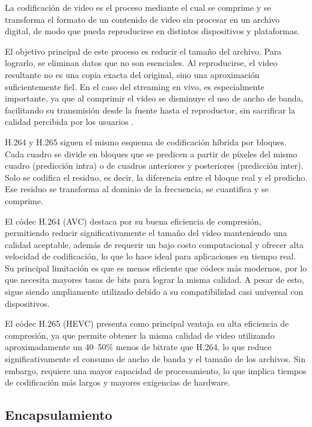 \documentclass[12pt,a4paper]{article}
\begin{document}
La codificación de video es el proceso mediante el cual se comprime y se transforma el formato de un contenido de video sin procesar en un archivo digital, de modo que pueda reproducirse en distintos dispositivos y plataformas.

El objetivo principal de este proceso es reducir el tamaño del archivo. Para lograrlo, se eliminan datos que no son esenciales. Al reproducirse, el video resultante no es una copia exacta del original, sino una aproximación suficientemente fiel. En el caso del streaming en vivo, es especialmente importante, ya que al comprimir el video se disminuye el uso de ancho de banda, facilitando su transmisión desde la fuente hasta el reproductor, sin sacrificar la calidad percibida por los usuarios \cite{ref24}.

H.264 y H.265 siguen el mismo esquema de codificación híbrida por bloques. Cada cuadro se divide en bloques que se predicen a partir de píxeles del mismo cuadro (predicción intra) o de cuadros anteriores y posteriores (predicción inter). Solo se codifica el residuo, es decir, la diferencia entre el bloque real y el predicho. Ese residuo se transforma al dominio de la frecuencia, se cuantifica y se comprime.

El códec H.264 (AVC) destaca por su buena eficiencia de compresión, permitiendo reducir significativamente el tamaño del video manteniendo una calidad aceptable, además de requerir un bajo costo computacional y ofrecer alta velocidad de codificación, lo que lo hace ideal para aplicaciones en tiempo real. Su principal limitación es que es menos eficiente que códecs más modernos, por lo que necesita mayores tasas de bits para lograr la misma calidad. A pesar de esto, sigue siendo ampliamente utilizado debido a su compatibilidad casi universal con dispositivos.

El códec H.265 (HEVC) presenta como principal ventaja su alta eficiencia de compresión, ya que permite obtener la misma calidad de video utilizando aproximadamente un 40--50\% menos de bitrate que H.264, lo que reduce significativamente el consumo de ancho de banda y el tamaño de los archivos. Sin embargo, requiere una mayor capacidad de procesamiento, lo que implica tiempos de codificación más largos y mayores exigencias de hardware.

\subsection{Encapsulamiento}\label{encapsulamiento}
\end{document}
